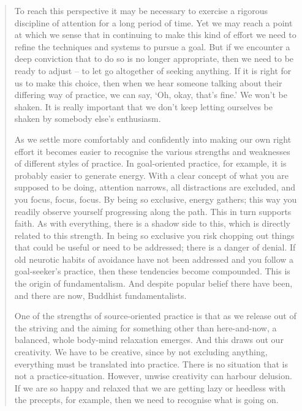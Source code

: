 \begin{quote}
To reach this perspective it may be necessary to exercise a rigorous
discipline of attention for a long period of time. Yet we may reach a
point at which we sense that in continuing to make this kind of effort
we need to refine the techniques and systems to pursue a goal. But if we
encounter a deep conviction that to do so is no longer appropriate, then
we need to be ready to adjust -- to let go altogether of seeking
anything. If it is right for us to make this choice, then when we hear
someone talking about their differing way of practice, we can say, `Oh,
okay, that's fine.' We won't be shaken. It is really important that we
don't keep letting ourselves be shaken by somebody else's enthusiasm.

As we settle more comfortably and confidently into making our own right
effort it becomes easier to recognise the various strengths and
weaknesses of different styles of practice. In goal-oriented practice,
for example, it is probably easier to generate energy. With a clear
concept of what you are supposed to be doing, attention narrows, all
distractions are excluded, and you focus, focus, focus. By being so
exclusive, energy gathers; this way you readily observe yourself
progressing along the path. This in turn supports faith. As with
everything, there is a shadow side to this, which is directly related to
this strength. In being so exclusive you risk chopping out things that
could be useful or need to be addressed; there is a danger of denial. If
old neurotic habits of avoidance have not been addressed and you follow
a goal-seeker's practice, then these tendencies become compounded. This
is the origin of fundamentalism. And despite popular belief there have
been, and there are now, Buddhist fundamentalists.

One of the strengths of source-oriented practice is that as we release
out of the striving and the aiming for something other than
here-and-now, a balanced, whole body-mind relaxation emerges. And this
draws out our creativity. We have to be creative, since by not excluding
anything, everything must be translated into practice. There is no
situation that is not a practice-situation. However, unwise creativity
can harbour delusion. If we are so happy and relaxed that we are getting
lazy or heedless with the precepts, for example, then we need to
recognise what is going on.


\end{quote}
